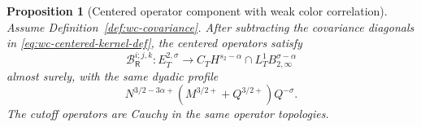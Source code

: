 \documentclass[10pt]{amsart}
\numberwithin{equation}{section}
\theoremstyle{plain}
\newtheorem{proposition}[theorem]{Proposition}
\theoremstyle{definition}
\theoremstyle{remark}
\begin{document}
\begin{proposition}[Centered operator component with weak color correlation]\label{prop:wc-centered-component}
Assume Definition~\ref{def:wc-covariance}.  After subtracting the covariance diagonals in \eqref{eq:wc-centered-kernel-def}, the centered operators satisfy
\begin{equation}\label{eq:wc-centered-op-bound}
        \mathcal B_{\mathsf R}^{i;j,k}:
        E_T^{2,\sigma}\longrightarrow C_TH^{s_2-\alpha}\cap L_T^1B_{2,\infty}^{\sigma-\alpha}
\end{equation}
almost surely, with the same dyadic profile
\begin{equation}\label{eq:wc-centered-profile}
        N^{3/2-3\alpha+}(M^{3/2+}+Q^{3/2+})Q^{-\sigma}.
\end{equation}
The cutoff operators are Cauchy in the same operator topologies.
\end{proposition}
\end{document}
